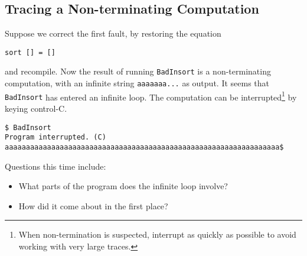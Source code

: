\documentclass[12pt]{article}
\begin{document}
\subsection{Tracing a Non-terminating Computation}
Suppose we correct the first fault, by restoring the equation
\begin{tabbing}
{\tt sort [] = []}
\end{tabbing}
and recompile.  Now the result of running {\tt BadInsort} is a non-terminating
computation, with an infinite string {\tt aaaaaaa...} as output. It seems
that {\tt BadInsort} has entered an infinite loop. The computation can be
interrupted\footnote{When non-termination is suspected,
interrupt as quickly as possible to
avoid working with very large traces.}
by keying control-C.
\begin{tabbing}
{\tt \$ BadInsort } \\
{\tt Program interrupted.\ (C)} \\
{\tt aaaaaaaaaaaaaaaaaaaaaaaaaaaaaaaaaaaaaaaaaaaaaaaaaaaaaaaaaaaaaaaaa\$ } \\
\end{tabbing}
Questions this time include:
\begin{itemize}
\item
What parts of the program does the infinite loop involve?
\item
How did it come about in the first place?
\end{itemize}
\end{document}

